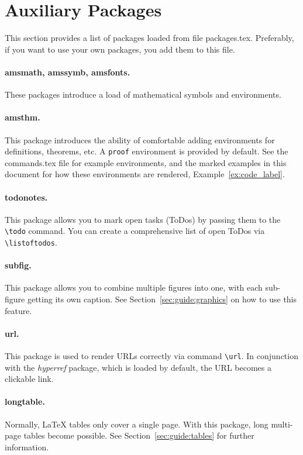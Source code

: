 \section{Auxiliary Packages}
\label{sec:packages:auxiliary_packages}
This section provides a list of packages loaded from file \mbox{packages.tex}.
Preferably, if you want to use your own packages, you add them to this file.


\paragraph{amsmath, amssymb, amsfonts.}
These packages introduce a load of mathematical symbols and environments.


\paragraph{amsthm.}
This package introduces the ability of comfortable adding environments for
definitions, theorems, etc. 
A \verb+proof+ environment is provided by default.
See the \mbox{commands.tex} file for example environments, and the marked
examples in this document for how these environments are rendered, \eg{}
Example~\ref{ex:code_label}.


\paragraph{todonotes.}
This package allows you to mark open tasks (ToDos) by passing them to the
\verb+\todo+ command.
You can create a comprehensive list of open ToDos via
\verb+\listoftodos+.


\paragraph{subfig.}
This package allows you to combine multiple figures into one, with each
sub-figure getting its own caption.
See Section~\ref{sec:guide:graphics} on how to use this feature.


\paragraph{url.}
This package is used to render URLs correctly via command \verb+\url+. 
In conjunction with the \emph{hyperref} package, which is loaded by default, the
URL becomes a clickable link. 


\paragraph{longtable.}
Normally, \LaTeX{} tables only cover a single page.
With this package, long multi-page tables become possible.
See Section~\ref{sec:guide:tables} for further information.


